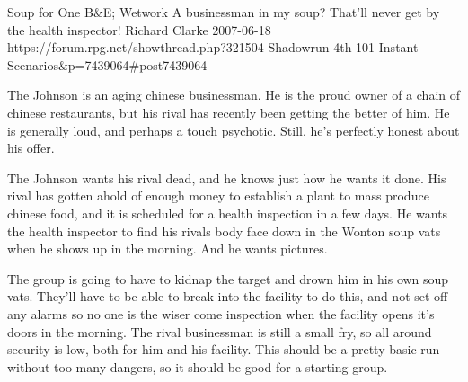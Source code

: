 \begin{scenario}{Soup for One}
	{B\&E; Wetwork}
	{A businessman in my soup? That'll never get by the health inspector!}
	{Richard Clarke}
	{2007-06-18}
	{https://forum.rpg.net/showthread.php?321504-Shadowrun-4th-101-Instant-Scenarios\&p=7439064#post7439064}

  The Johnson is an aging chinese businessman. He is the proud owner of a chain of chinese restaurants, but his rival has recently been getting the better of him. He is generally loud, and perhaps a touch psychotic. Still, he's perfectly honest about his offer.

\synopsis The Johnson wants his rival dead, and he knows just how he wants it done. His rival has gotten ahold of enough money to establish a plant to mass produce chinese food, and it is scheduled for a health inspection in a few days. He wants the health inspector to find his rivals body face down in the Wonton soup vats when he shows up in the morning. And he wants pictures. 

\notes The group is going to have to kidnap the target and drown him in his own soup vats. They'll have to be able to break into the facility to do this, and not set off any alarms so no one is the wiser come inspection when the facility opens it's doors in the morning. The rival businessman is still a small fry, so all around security is low, both for him and his facility. This should be a pretty basic run without too many dangers, so it should be good for a starting group. 

\end{scenario}